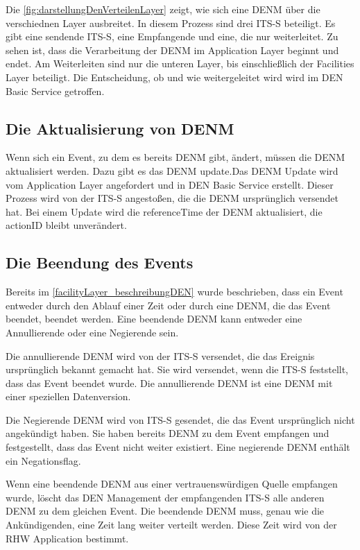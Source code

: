 Die \autoref{fig:darstellungDenVerteilenLayer} zeigt, wie sich eine \ac{DENM} über die verschiednen Layer ausbreitet. In diesem Prozess sind drei \ac{ITS-S} beteiligt. Es gibt eine sendende \ac{ITS-S}, eine Empfangende und eine, die nur weiterleitet. Zu sehen ist, dass die Verarbeitung der \ac{DENM} im Application Layer beginnt und endet. Am Weiterleiten sind nur die unteren Layer, bis einschließlich der Facilities Layer beteiligt. Die Entscheidung, ob und wie weitergeleitet wird wird im \ac{DEN} Basic Service getroffen. 

\subsection{Die Aktualisierung von DENM}
Wenn sich ein Event, zu dem es bereits \ac{DENM} gibt, ändert, müssen die \ac{DENM} aktualisiert werden. Dazu gibt es das \ac{DENM} update.Das \ac{DENM} Update wird vom Application Layer angefordert und in \ac{DEN} Basic Service erstellt. Dieser Prozess wird von der \ac{ITS-S} angestoßen, die die \ac{DENM} ursprünglich versendet hat. Bei einem Update wird die referenceTime der \ac{DENM} aktualisiert, die actionID bleibt unverändert. 

 
\subsection{Die Beendung des Events}
Bereits im \autoref{facilityLayer_beschreibungDEN} wurde beschrieben, dass ein Event entweder durch den Ablauf einer Zeit oder durch eine \ac{DENM}, die das Event beendet, beendet werden. Eine beendende \ac{DENM} kann entweder eine Annullierende oder eine Negierende sein. 

Die annullierende \ac{DENM} wird von der \ac{ITS-S} versendet, die das Ereignis ursprünglich bekannt gemacht hat. Sie wird versendet, wenn die \ac{ITS-S} feststellt, dass das Event beendet wurde.  Die annullierende \ac{DENM} ist eine \ac{DENM} mit einer speziellen Datenversion.

Die Negierende \ac{DENM} wird von \ac{ITS-S} gesendet, die das Event ursprünglich nicht angekündigt haben. Sie haben bereits \ac{DENM} zu dem Event empfangen und festgestellt, dass das Event nicht weiter existiert. Eine negierende \ac{DENM} enthält ein Negationsflag. 

Wenn eine beendende \ac{DENM} aus einer vertrauenswürdigen Quelle empfangen wurde, löscht das \ac{DEN} Management der empfangenden \ac{ITS-S} alle anderen \ac{DENM} zu dem gleichen Event. Die beendende \ac{DENM} muss, genau wie die Ankündigenden, eine Zeit lang weiter verteilt werden. Diese Zeit wird von der \ac{RHW} Application bestimmt.


